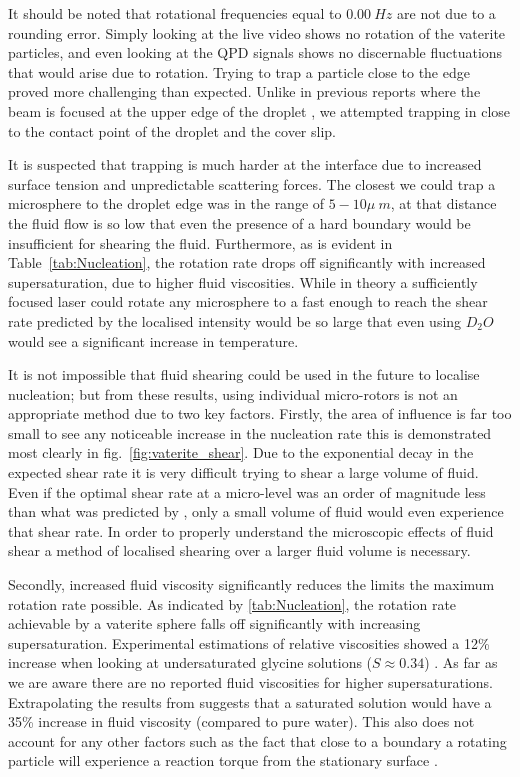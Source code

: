 It should be noted that rotational frequencies equal to 
$0.00\ Hz$ are not due to a rounding error. Simply looking
at the live video shows no rotation of the vaterite particles,
and even looking at the QPD signals shows no discernable 
fluctuations that would arise due to rotation. Trying to trap 
a particle close to the edge proved more challenging than 
expected. Unlike in previous reports where the beam is 
focused at the upper edge of the droplet \cite{Liao2022, 
Yuyama2010, Sugiyama2022}, we attempted trapping in close 
to the contact point of the droplet and the cover slip. 

It is suspected that trapping is much harder at the 
interface due to increased surface tension and unpredictable 
scattering forces. The closest we could trap a microsphere to 
the droplet edge was in the range of $5-10\mu\ m$, at that 
distance the fluid flow is so low that even the presence of a 
hard boundary would be insufficient for shearing the fluid. 
Furthermore, as is evident in Table~\ref{tab:Nucleation}, 
the rotation rate drops off significantly with increased 
supersaturation, due to higher fluid viscosities. While in 
theory a sufficiently focused laser could rotate any 
microsphere to a fast enough to reach the shear rate 
predicted by \cite{Debuysschere2023} the localised intensity 
would be so large that even using $D_2O$ would see a significant 
increase in temperature. 

It is not impossible that fluid shearing could be used in the 
future to localise nucleation; but from these results, using 
individual micro-rotors is not an appropriate method due to
two key factors. Firstly, the area of influence is far too 
small to see any noticeable increase in the nucleation rate 
this is demonstrated most clearly in fig.~\ref{fig:vaterite_shear}. 
Due to the exponential decay in the expected shear rate it is 
very difficult trying to shear a large volume of fluid. Even 
if the optimal shear rate at a micro-level was an order of 
magnitude less than what was predicted by \cite{Debuysschere2023}, 
only a small volume of fluid would even experience that shear 
rate. In order to properly understand the microscopic effects 
of fluid shear a method of localised shearing over a larger 
fluid volume is necessary.  

Secondly, increased fluid viscosity significantly reduces 
the limits the maximum rotation rate possible. As indicated 
by \ref{tab:Nucleation}, the rotation rate achievable by a
vaterite sphere falls off significantly with increasing 
supersaturation. Experimental estimations of relative viscosities
showed a 12\% increase when looking at undersaturated glycine
solutions ($S\approx0.34$) \cite{Patyar2020}. As far as we
are aware there are no reported fluid viscosities for higher
supersaturations. Extrapolating the results from \cite{Patyar2020}
suggests that a saturated solution would have a 35\% increase 
in fluid viscosity (compared to pure water). This also does 
not account for any other factors such as the fact that close
to a boundary a rotating particle will experience a reaction
torque from the stationary surface \cite{Bruce2020}. 

